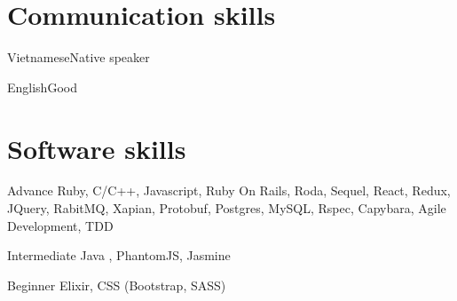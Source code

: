 \documentclass{tccv}
\begin{document}
\section{Communication skills}

\begin{factlist}
\item{Vietnamese}{Native speaker}
\item{English}{Good}
\end{factlist}

\section{Software skills}

\begin{factlist}

\item{Advance}
     {Ruby, C/C++, Javascript,
     Ruby On Rails, Roda, Sequel, React, Redux, JQuery,
     RabitMQ, Xapian, Protobuf,
     Postgres, MySQL,
     Rspec, Capybara,
     Agile Development, TDD}

\item{Intermediate}
     {Java , PhantomJS, Jasmine}

\item{Beginner}
     {Elixir, CSS (Bootstrap, SASS)}
\end{factlist}
\end{document}
